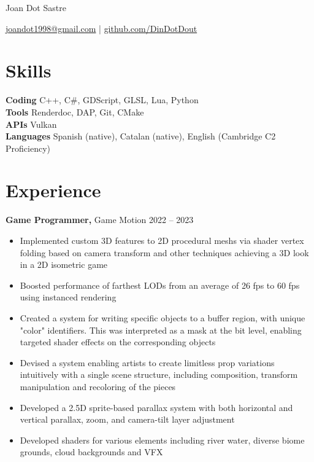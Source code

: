 \documentclass[10pt]{article}       %
\begin{document}
\centerline{\Huge Joan Dot Sastre}

\vspace{5pt}

\centerline{\href{mailto:joandot1998@gmail.com}{joandot1998@gmail.com} | \href{https://github.com/DinDotDout}{github.com/DinDotDout}}

\vspace{-10pt}

\section*{Skills}
\textbf{Coding} C++, C\#, GDScript, GLSL, Lua, Python \\
\textbf{Tools} Renderdoc, DAP, Git, CMake \\
\textbf{APIs} Vulkan \\
\textbf{Languages} Spanish (native), Catalan (native), English (Cambridge C2 Proficiency)

\vspace{-6.5pt}

\section*{Experience}
\textbf{Game Programmer,} {Game Motion} \hfill 2022 -- 2023\\
\vspace{-9pt}
\begin{itemize}
	\item Implemented custom 3D features to 2D procedural meshs via shader vertex folding based
        on camera transform and other techniques achieving a 3D look in a 2D isometric game
	\item Boosted performance of farthest LODs from an average of 26 fps to 60 fps using instanced rendering
	\item Created a system for writing specific objects to a buffer region, with
        unique "color" identifiers. This was interpreted as a mask at the bit level,
        enabling targeted shader effects on the corresponding objects
	\item Devised a system enabling artists to create limitless prop variations intuitively with
        a single scene structure, including composition, transform manipulation and recoloring of the pieces
	\item Developed a 2.5D sprite-based parallax system with both horizontal and vertical
        parallax, zoom, and camera-tilt layer adjustment
	\item Developed shaders for various elements including river water, diverse biome grounds, cloud backgrounds and VFX

\end{itemize}
\end{document}
